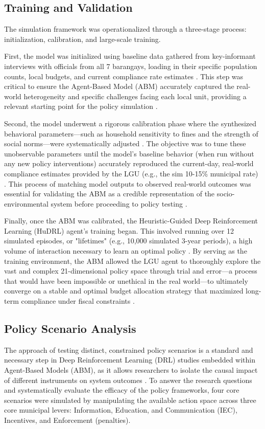 \subsection{Training and Validation}
The simulation framework was operationalized through a three-stage process: initialization, calibration, and large-scale training. 

First, the model was initialized using baseline data gathered from key-informant interviews with officials from all 7 barangays, loading in their specific population counts, local budgets, and current compliance rate estimates \citep{Villanueva2021, Yazawa2025}. This step was critical to ensure the Agent-Based Model (ABM) accurately captured the real-world heterogeneity and specific challenges facing each local unit, providing a relevant starting point for the policy simulation \citep{Camarillo2021}.

Second, the model underwent a rigorous calibration phase where the synthesized behavioral parameters—such as household sensitivity to fines and the strength of social norms—were systematically adjusted \citep{Taraghi2025, Ceschi2021}. The objective was to tune these unobservable parameters until the model's baseline behavior (when run without any new policy interventions) accurately reproduced the current-day, real-world compliance estimates provided by the LGU (e.g., the sim 10-15\% municipal rate) \citep{Jimenez2025}. This process of matching model outputs to observed real-world outcomes was essential for validating the ABM as a credible representation of the socio-environmental system before proceeding to policy testing \citep{Ma2023}.

Finally, once the ABM was calibrated, the Heuristic-Guided Deep Reinforcement Learning (HuDRL) agent's training began. This involved running over 12 simulated episodes, or "lifetimes" (e.g., 10,000 simulated 3-year periods), a high volume of interaction necessary to learn an optimal policy \citep{Dey2025}. By serving as the training environment, the ABM allowed the LGU agent to thoroughly explore the vast and complex 21-dimensional policy space through trial and error—a process that would have been impossible or unethical in the real world—to ultimately converge on a stable and optimal budget allocation strategy that maximized long-term compliance under fiscal constraints \citep{TianReview2024}.

\subsection{Policy Scenario Analysis}
The approach of testing distinct, constrained policy scenarios is a standard and necessary step in Deep Reinforcement Learning (DRL) studies embedded within Agent-Based Models (ABM), as it allows researchers to isolate the causal impact of different instruments on system outcomes \citep{Jimenez2025, TianReview2024}. To answer the research questions and systematically evaluate the efficacy of the policy frameworks, four core scenarios were simulated by manipulating the available action space across three core municipal levers: Information, Education, and Communication (IEC), Incentives, and Enforcement (penalties).

